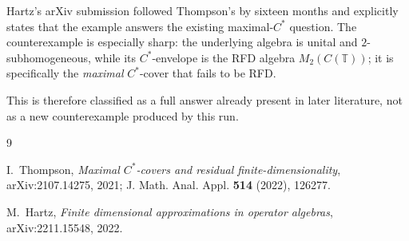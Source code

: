 \documentclass[11pt]{article}
\newcommand{\T}{\mathbb T}
\begin{document}
Hartz's arXiv submission followed Thompson's by sixteen months and explicitly
states that the example answers the existing maximal-$C^*$ question.  The
counterexample is especially sharp: the underlying algebra is unital and
$2$-subhomogeneous, while its $C^*$-envelope is the RFD algebra
$M_2(C(\T))$; it is specifically the \emph{maximal} $C^*$-cover that fails
to be RFD.

This is therefore classified as a full answer already present in later
literature, not as a new counterexample produced by this run.

\begin{thebibliography}{9}

I.~Thompson,
\emph{Maximal $C^*$-covers and residual finite-dimensionality},
arXiv:2107.14275, 2021; J. Math. Anal. Appl. \textbf{514} (2022), 126277.

M.~Hartz,
\emph{Finite dimensional approximations in operator algebras},
arXiv:2211.15548, 2022.

\end{thebibliography}
\end{document}
